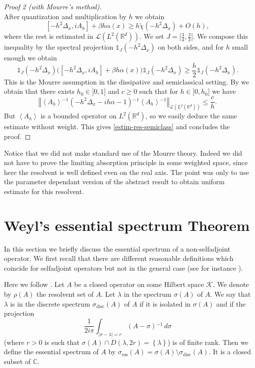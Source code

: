 \documentclass[10pt, a4paper,reqno]{amsart}
\theoremstyle{plain}
\theoremstyle{definition}
\theoremstyle{remark}
\begin{document}
\begin{proof}[Proof 2 (with Mourre's method)]
\[\]
After quantization and multiplication by $h$ we obtain
\[
[-h^2 {{\Delta}_x} , i A_h] + {\beta} h {\alpha}(x) {\geqslant}  h \tilde {\chi}(-h^2{{\Delta}_x}) + O(h), 
\]
where the rest is estimated in ${{\mathcal L}}(L^2({\mathbb{R}}^d))$. We set $J = \big[\frac 34, \frac 32\big]$. We compose this inequality by the spectral projection ${\mathds 1}_J(-h^2{{\Delta}_x})$ on both sides, and for $h$ small enough we obtain
\[
{\mathds 1}_J (-h^2{{\Delta}_x}) \big([-h^2 {{\Delta}_x} , i A_h] + {\beta} h {\alpha}(x) \big) {\mathds 1}_J (-h^2{{\Delta}_x}) {\geqslant}  \frac h 2 {\mathds 1}_J (-h^2{{\Delta}_x}). 
\]
This is the Mourre assumption in the dissipative and semiclassical setting. By \cite{royer-mourre-formes} we obtain that there exists $h_0 \in ]0,1]$ and $c {\geqslant} 0$ such that for $h \in ]0,h_0]$ we have 
\[
{\left\Vert {{\left< {A_h} \right>} {^{-1}} (-h^2{{\Delta}_x} -ih{\alpha} - 1){^{-1}} {\left< {A_h} \right>}{^{-1}}}\right\Vert}_{{{\mathcal L}}(L^2({\mathbb{R}}^d))} {\leqslant} \frac c h.
\]
But ${\left< {A_h} \right>}$ is a bounded operator on $L^2({\mathbb{R}}^d)$, so we easily deduce the same estimate without weight. This gives \eqref{estim-res-semiclass} and concludes the proof.
\end{proof}

Notice that we did not make standard use of the Mourre theory. Indeed we did not have to prove the limiting absorption principle in some weighted space, since here the resolvent is well defined even on the real axis. The point was only to use the parameter dependant version of the abstract result to obtain uniform estimate for this resolvent.

\section{Weyl's essential spectrum Theorem} \label{sec-weyl}

In this section we briefly discuss the essential spectrum of a non-selfadjoint operator. We first recall that there are different reasonable definitions which coincide for selfadjoint operators but not in the general case (see for instance \cite{Schechter66,GustafsonWei69,EdmundsEva}). 

Here we follow \cite{rs4}. Let $A$ be a closed operator on some Hilbert space ${{\mathcal K}}$. We denote by $\rho(A)$ the resolvent set of $A$. Let ${\lambda}$ in the spectrum ${\sigma}(A)$ of $A$. We say that ${\lambda}$ is in the discrete spectrum ${\sigma}_{{\mathrm{disc}}}(A)$ of $A$ if it is isolated in ${\sigma}(A)$ and if the projection
\[
\frac 1 {2i\pi} \int_{{\left\vert {{\sigma}-{\lambda}}\right\vert} = r} (A-{\sigma}){^{-1}} \, d{\sigma}
\]
(where $r > 0$ is such that ${\sigma}(A) \cap D({\lambda},2r)={\left\{ {\lambda} \right\}}$) is of finite rank. Then we define the essential spectrum of $A$ by ${\sigma}_{{\mathrm{ess}}}(A) = {\sigma}(A) \setminus {\sigma}_{{\mathrm{disc}}}(A)$. It is a closed subset of ${\mathbb{C}}$.
\end{document}
